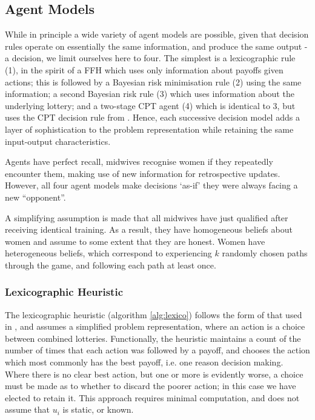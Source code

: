 \subsection{Agent Models}
\label{sub:the_agents}

While in principle a wide variety of agent models are possible, given that decision rules operate on essentially the same information, and produce the same output - a decision, we limit ourselves here to four. The simplest is a lexicographic rule (1), in the spirit of a \ac{FFH} \citep{Gigerenzer2004} which uses only information about payoffs given actions; this is followed by a Bayesian risk minimisation rule (2) using the same information; a second Bayesian risk rule (3) which uses information about the underlying lottery; and a two-stage \ac{CPT} \citep{Hau2008} agent (4) which is identical to 3, but uses the \ac{CPT} decision rule from \cite{Tversky1992}. Hence, each successive decision model adds a layer of sophistication to the problem representation while retaining the same input-output characteristics.

Agents have perfect recall, midwives recognise women if they repeatedly encounter them, making use of new information for retrospective updates. However, all four agent models make decisions `as-if' they were always facing a new \enquote{opponent}.

A simplifying assumption is made that all midwives have just qualified after receiving identical training. As a result, they have homogeneous beliefs about  women and assume to some extent that they are honest.
Women have heterogeneous beliefs, which correspond to experiencing \(k\) randomly chosen paths through the game, and following each path at least once.


\subsubsection{Lexicographic Heuristic}
\label{sub:lexico}

The lexicographic heuristic (algorithm \ref{alg:lexico}) follows the form of that used in \cite{Hau2008}, and assumes a simplified problem representation, where an action is a choice between combined lotteries. Functionally, the heuristic maintains a count of the number of times that each action was followed by a payoff, and chooses the action which most commonly has the best payoff, i.e. one reason decision making. Where there is no clear best action, but one or more is evidently worse, a choice must be made as to whether to discard the poorer action; in this case we have elected to retain it.
This approach requires minimal computation, and does not assume that \(u_{i}\) is static, or known.


